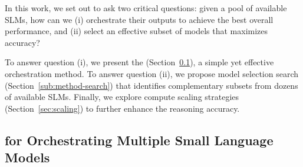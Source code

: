 



In this work, we set out to ask two critical questions: given a pool of available SLMs, how can we (i) orchestrate their outputs to achieve the best overall performance, and (ii) select an effective subset of models that maximizes accuracy?

To answer question (i), we present the \NAME{}{} (Section~\ref{sub:method-arch}), a simple yet effective orchestration method. To answer question (ii), we propose model selection search (Section~\ref{sub:method-search}) that identifies complementary subsets from dozens of available SLMs. Finally, we explore compute scaling strategies (Section~\ref{sec:scaling}) to further enhance the reasoning accuracy. 



\subsection{\NAME{}{} for Orchestrating Multiple Small Language Models
}
\label{sub:method-arch}


